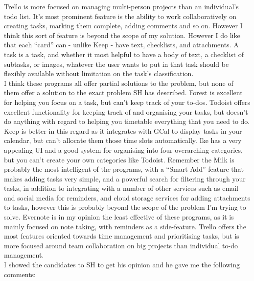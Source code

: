 \documentclass{article}
\begin{document}
Trello is more focused on managing multi-person projects than an individual's
todo list. It's most prominent feature is the ability to work collaboratively on
creating tasks, marking them complete, adding comments and so on. However I
think this sort of feature is beyond the scope of my solution. However I do like
that each ``card'' can - unlike Keep - have text, checklists, and attachments. A
task is a task, and whether it most helpful to have a body of text, a checklist
of subtasks, or images, whatever the user wants to put in that task should be
flexibly available without limitation on the task's classification.\\

I think these programs all offer partial solutions to the problem, but none of
them offer a solution to the exact problem SH has described. Forest is excellent
for helping you focus on a task, but can't keep track of your to-dos. Todoist
offers excellent functionality for keeping track of and organising your tasks,
but doesn't do anything with regard to helping you timetable everything that you
need to do. Keep is better in this regard as it integrates with GCal to display
tasks in your calendar, but can't allocate them those time slots automatically.
Ike has a very appealing UI and a good system for organising into four
overarching categories, but you can't create your own categories like Todoist.
Remember the Milk is probably the most intelligent of the programs, with a
``Smart Add'' feature that makes adding tasks very simple, and a powerful search
for filtering through your tasks, in addition to integrating with a number of
other services such as email and social media for reminders, and cloud storage
services for adding attachments to tasks, however this is probably beyond the
scope of the problem I'm trying to solve. Evernote is in my opinion the least
effective of these programs, as it is mainly focused on note taking, with
reminders as a side-feature. Trello offers the most features oriented towards
time management and prioritising tasks, but is more focused around team
collaboration on big projects than individual to-do management.\\

I showed the candidates to SH to get his opinion and he gave me the following
comments:
\end{document}
